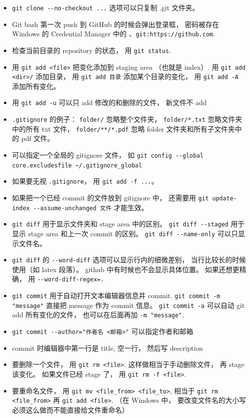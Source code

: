 \begin{itemize}
\item \verb`git clone --no-checkout ...` 选项可以只复制 .git 文件夹。
\item Git bash 第一次 push 到 GitHub 的时候会弹出登录框， 密码被存在 Windows 的 Credential Manager 中的 、\verb`git:https://github.com`.
\item 检查当前目录的 repository 的状态， 用 \verb`git status`. 
\item 用 \verb`git add <file>` 把变化添加到 staging area （也就是 index）. 用 \verb`git add <dir>/` 添加目录， 用 \verb`git add 目录` 添加某个目录的变化， 用 \verb`git add -A` 添加所有变化。
\item 用 \verb`git add -u` 可以只 add 修改的和删除的文件， 新文件不 add
\item \verb`.gitignore` 的例子： \verb`folder/` 忽略整个文件夹， \verb`folder/*.txt` 忽略文件夹中的所有 txt 文件， \verb`folder/**/*.pdf` 忽略 folder 文件夹和所有子文件夹中的 pdf 文件。
\item 可以指定一个全局的 gitignore 文件， 如 \verb`git config --global core.excludesfile ~/.gitignore_global`
\item 如果要无视 \verb`.gitignore`， 用 \verb`git add -f ...`。
\item 如果把一个已经 commit 的文件放到 gitignore 中， 还需要用 \verb`git update-index --assume-unchanged 文件` 才能生效。
\item \verb`git diff` 用于显示文件夹和 stage area 中的区别。 \verb`git diff --staged` 用于显示 stage area 和上一次 commit 的区别。 \verb`git diff --name-only` 可以只显示文件名。
\item \verb`git diff` 的 \verb`--word-diff` 选项可以显示行内的细微差别， 当行比较长的时候使用（如 latex 段落）。 github 中有时候也不会显示具体位置。 如果还想更精确， 用 \verb`--word-diff-regex=.`
\item \verb`git commit` 用于自动打开文本编辑器信息并 commit. \verb`git commit -m "message"` 直接把 message 作为 commit 信息。 \verb`git commit -a` 可以自动 git add 所有变化的文件， 也可以在后面再加 \verb`-m "message"`.
\item \verb`git commit --author="作者名 <邮箱>"` 可以指定作者和邮箱
\item commit 时编辑器中第一行是 title, 空一行， 然后写 description
\item 要删除一个文件， 用 \verb`git rm <file>`. 这样做相当于手动删除文件， 再 stage 该变化。 如果文件已经 stage 了， 用 \verb`git rm -f <file>`.
\item 要重命名文件， 用 \verb`git mv <file_from> <file_to>`, 相当于 \verb`git rm <file_from>` 再 \verb`git add <file>`. （在 Windows 中， 要改变文件名的大小写必须这么做而不能直接给文件重命名）

\end{itemize}
